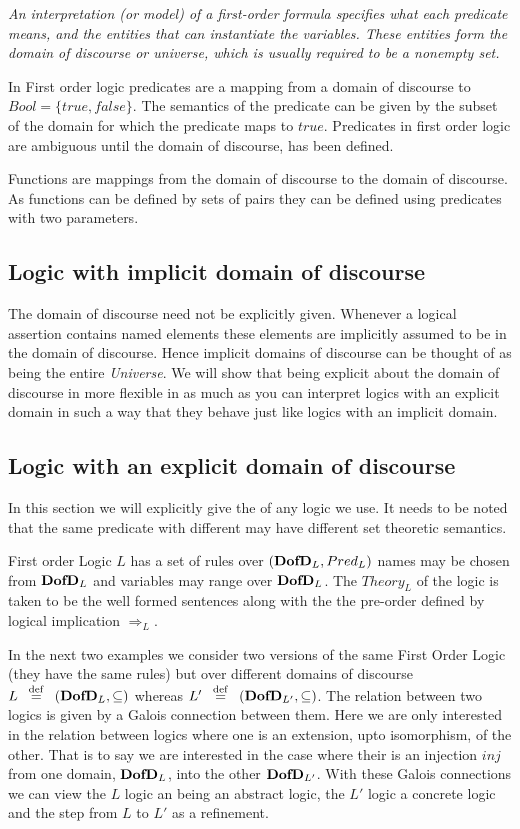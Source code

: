 \emph{An interpretation (or model) of a first-order formula specifies what each predicate means, and the entities that can instantiate the variables. These entities form the domain of discourse or universe, which is usually required to be a nonempty set.}


In First order logic predicates are a mapping from a domain of discourse to $Bool=\{true,false\}$. The semantics of the predicate can be given by the subset of the domain for which the predicate maps to $true$.
Predicates in first order logic are ambiguous  until the domain of discourse, \DofD  has been defined. 


Functions are mappings from the domain of discourse to the domain of discourse. As functions can be defined by sets of pairs they can  be defined using predicates with two parameters. 


\subsection{Logic with implicit domain of discourse}

The domain of discourse need not be explicitly given. Whenever a logical assertion contains named elements these elements are implicitly assumed to be in the domain of discourse. Hence implicit domains of discourse can be thought of as being the entire \emph{Universe}. 
 We will show that being explicit about the domain of discourse in more flexible in as much as you can interpret logics with an explicit domain   in such a way that they behave just like logics with an implicit domain.


\subsection{Logic with an explicit domain of discourse}\label{sec:Ldd}



  In this section we will explicitly give the \DofD of any logic we use. It needs to be noted that the same predicate with different \DofD may have different set theoretic semantics.


First order Logic $L$ has a set of rules over $( {\bf DofD }_L, Pred_L)$   names may be chosen from ${\bf DofD }_L$ and variables may range over ${\bf DofD }_L$. The $Theory_L$ of the logic is taken to be the well formed sentences along with the the pre-order defined by logical implication $\Rightarrow_L$. 


In the next two examples we consider two versions of the same First Order Logic (they have the same rules)  but  over different domains of discourse $L \hspace*{0.5em} \stackrel{\mathrm{def}}{=} \hspace*{0.5em} ({\bf DofD }_L,\subseteq )$  whereas  $L' \hspace*{0.5em} \stackrel{\mathrm{def}}{=} \hspace*{0.5em} ({\bf DofD }_{L'},\subseteq)$. 
The relation between two logics is given by a Galois connection between them. Here we are only interested in the relation between logics where one is an extension, upto isomorphism, of the other. That is to say we are interested in the case where their is an injection $inj$ from one domain, ${\bf DofD }_L$,  into the other ${\bf DofD }_{L'}$. 
With these Galois connections we can view the $L$ logic an being an abstract logic, the $L'$ logic a concrete logic and the step from $L$ to $L'$ as a refinement.

